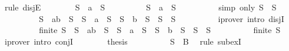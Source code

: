 \begin{isabellebody}
\ {\isacharparenleft}rule\ disjE{\isacharparenright}\isanewline
\ \ \ \ \ \ \isamarkupfalse%
\ {\isachardoublequoteopen}S\ {\isacharequal}\ {\isacharbraceleft}a{\isacharbraceright}\ {\isasymunion}\ S{}{\isachardoublequoteclose}\isanewline
\ \ \ \ \ \ \isamarkupfalse%
\ \isamarkupfalse%
\ {\isachardoublequoteopen}S\ {\isacharequal}\ {\isacharbraceleft}a{\isacharbraceright}\ {\isasymunion}\ S{}{\isachardoublequoteclose}\isanewline
\ \ \ \ \ \ \ \ \isamarkupfalse%
\ {\isacharparenleft}simp\ only{\isacharcolon}\ {\isacartoucheopen}S{}\ {\isacharequal}\ S{}{\isacartoucheclose}{\isacharparenright}\isanewline
\ \ \ \ \ \ \isamarkupfalse%
\ \isamarkupfalse%
\ {\isachardoublequoteopen}S\ {\isacharequal}\ {\isacharbraceleft}a{\isacharcomma}b{\isacharbraceright}\ {\isasymunion}\ S{}\ {\isasymor}\ S\ {\isacharequal}\ {\isacharbraceleft}a{\isacharbraceright}\ {\isasymunion}\ S{}\ {\isasymor}\ S\ {\isacharequal}\ {\isacharbraceleft}b{\isacharbraceright}\ {\isasymunion}\ S{}\ {\isasymor}\ S\ {\isacharequal}\ S{}{\isachardoublequoteclose}\isanewline
\ \ \ \ \ \ \ \ \isamarkupfalse%
\ {\isacharparenleft}iprover\ intro{\isacharcolon}\ disjI{}{\isacharparenright}\isanewline
\ \ \ \ \ \ \isamarkupfalse%
\ \isamarkupfalse%
\ {\isachardoublequoteopen}finite\ S{}\ {\isasymand}\ {\isacharparenleft}S\ {\isacharequal}\ {\isacharbraceleft}a{\isacharcomma}b{\isacharbraceright}\ {\isasymunion}\ S{}\ {\isasymor}\ S\ {\isacharequal}\ {\isacharbraceleft}a{\isacharbraceright}\ {\isasymunion}\ S{}\ {\isasymor}\ S\ {\isacharequal}\ {\isacharbraceleft}b{\isacharbraceright}\ {\isasymunion}\ S{}\ {\isasymor}\ S\ {\isacharequal}\ S{}{\isacharparenright}{\isachardoublequoteclose}\isanewline
\ \ \ \ \ \ \ \ \isamarkupfalse%
\ {\isacartoucheopen}finite\ S{}{\isacartoucheclose}\ \isamarkupfalse%
\ {\isacharparenleft}iprover\ intro{\isacharcolon}\ conjI{\isacharparenright}\isanewline
\ \ \ \ \ \ \isamarkupfalse%
\ {\isacharquery}thesis\isanewline
\ \ \ \ \ \ \ \ \isamarkupfalse%
\ {\isacartoucheopen}S{}\ {\isasymsubseteq}\ B{\isacartoucheclose}\ \isamarkupfalse%
\ {\isacharparenleft}rule\ subexI{\isacharparenright}\isanewline
\ \ \ \ \isamarkupfalse%
\isanewline

\end{isabellebody}
